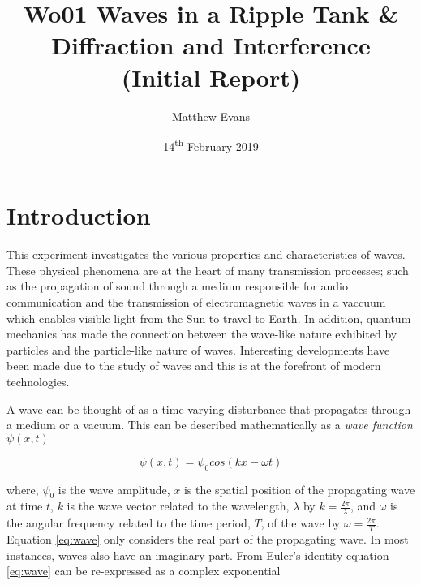 \documentclass{article}
\begin{document}
\title{Wo01 Waves in a Ripple Tank \& Diffraction and Interference \\ \large{(Initial Report)}} %
\author{Matthew Evans}%
\date{14\textsuperscript{th} February 2019} %
\maketitle %



\section{Introduction}
\label{sec:introduction}

This experiment investigates the various properties and characteristics of waves. These physical phenomena are at the heart of many transmission processes; such as the propagation of sound through a medium responsible for audio communication and the transmission of electromagnetic waves in a vaccuum which enables visible light from the Sun to travel to Earth. In addition, quantum mechanics has made the connection between the wave-like nature exhibited by particles and the particle-like nature of waves. Interesting developments have been made due to the study of waves and this is at the forefront of modern technologies.

\vspace{2mm}
\noindent
A wave can be thought of as a time-varying disturbance that propagates through a medium or a vacuum. This can be described mathematically as a \textit{wave function} $\psi(x, t)$

\begin{equation}
\label{eq:wave}
\psi(x, t) = \psi_0 cos(kx - \omega t)
\end{equation}

\vspace{2mm}
\noindent
where, $\psi_0$ is the wave amplitude, $x$ is the spatial position of the propagating wave at time $t$, $k$ is the wave vector related to the wavelength, $\lambda$ by $k = \frac{2\pi}{\lambda}$, and $\omega$ is the angular frequency related to the time period, $T$, of the wave by $\omega = \frac{2\pi}{T}$. Equation \eqref{eq:wave} only considers the real part of the propagating wave. In most instances, waves also have an imaginary part. From Euler's identity equation \eqref{eq:wave} can be re-expressed as a complex exponential
\end{document}
